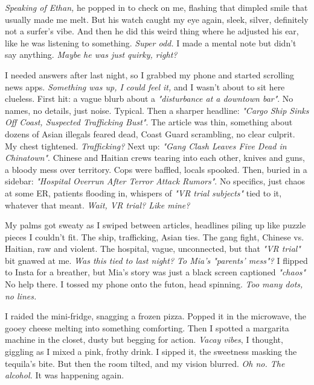 \documentclass[12pt,oneside]{book} %
\begin{document}
\textit{Speaking of Ethan,} he popped in to check on me, flashing that dimpled smile that usually made me melt. But his watch caught my eye again, sleek, silver, definitely not a surfer’s vibe. And then he did this weird thing where he adjusted his ear, like he was listening to something. \textit{Super odd.} I made a mental note but didn’t say anything. \textit{Maybe he was just quirky, right?}

I needed answers after last night, so I grabbed my phone and started scrolling news apps. \textit{Something was up, I could feel it,} and I wasn’t about to sit here clueless. First hit: a vague blurb about a \textit{"disturbance at a downtown bar"}. No names, no details, just noise. Typical. Then a sharper headline: \textit{"Cargo Ship Sinks Off Coast, Suspected Trafficking Bust"}. The article was thin, something about dozens of Asian illegals feared dead, Coast Guard scrambling, no clear culprit. My chest tightened. \textit{Trafficking?} Next up: \textit{"Gang Clash Leaves Five Dead in Chinatown"}. Chinese and Haitian crews tearing into each other, knives and guns, a bloody mess over territory. Cops were baffled, locals spooked. Then, buried in a sidebar: \textit{"Hospital Overrun After Terror Attack Rumors"}. No specifics, just chaos at some ER, patients flooding in, whispers of \textit{"VR trial subjects"} tied to it, whatever that meant. \textit{Wait, VR trial? Like mine?}

My palms got sweaty as I swiped between articles, headlines piling up like puzzle pieces I couldn’t fit. The ship, trafficking, Asian ties. The gang fight, Chinese vs. Haitian, raw and violent. The hospital, vague, unconnected, but that \textit{"VR trial"} bit gnawed at me. \textit{Was this tied to last night? To Mia’s "parents’ mess"?} I flipped to Insta for a breather, but Mia’s story was just a black screen captioned \textit{"chaos"} No help there. I tossed my phone onto the futon, head spinning. \textit{Too many dots, no lines.}

I raided the mini-fridge, snagging a frozen pizza. Popped it in the microwave, the gooey cheese melting into something comforting. Then I spotted a margarita machine in the closet, dusty but begging for action. \textit{Vacay vibes}, I thought, giggling as I mixed a pink, frothy drink. I sipped it, the sweetness masking the tequila’s bite. But then the room tilted, and my vision blurred. \textit{Oh no. The alcohol.} It was happening again.
\end{document}
